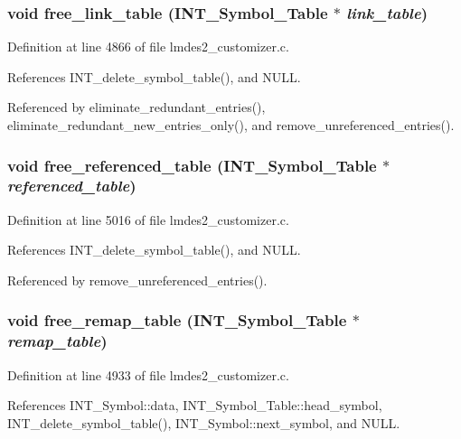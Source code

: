 \subsubsection{\setlength{\rightskip}{0pt plus 5cm}void free\_\-link\_\-table (\bf{INT\_\-Symbol\_\-Table} $\ast$ {\em link\_\-table})}\label{lmdes2__customizer_8c_fa4c4f19e0105b0a4fb487dafb37bd84}




Definition at line 4866 of file lmdes2\_\-customizer.c.

References INT\_\-delete\_\-symbol\_\-table(), and NULL.

Referenced by eliminate\_\-redundant\_\-entries(), eliminate\_\-redundant\_\-new\_\-entries\_\-only(), and remove\_\-unreferenced\_\-entries().
\subsubsection{\setlength{\rightskip}{0pt plus 5cm}void free\_\-referenced\_\-table (\bf{INT\_\-Symbol\_\-Table} $\ast$ {\em referenced\_\-table})}\label{lmdes2__customizer_8c_4b79fa02bfedc02fd8a999e382611b64}




Definition at line 5016 of file lmdes2\_\-customizer.c.

References INT\_\-delete\_\-symbol\_\-table(), and NULL.

Referenced by remove\_\-unreferenced\_\-entries().
\subsubsection{\setlength{\rightskip}{0pt plus 5cm}void free\_\-remap\_\-table (\bf{INT\_\-Symbol\_\-Table} $\ast$ {\em remap\_\-table})}\label{lmdes2__customizer_8c_7b841160a37c9819cb24c2709727eb58}




Definition at line 4933 of file lmdes2\_\-customizer.c.

References INT\_\-Symbol::data, INT\_\-Symbol\_\-Table::head\_\-symbol, INT\_\-delete\_\-symbol\_\-table(), INT\_\-Symbol::next\_\-symbol, and NULL.

